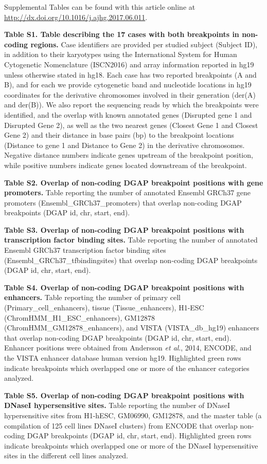 \documentclass[a4paper,twoside=true,openright,parskip=full,chapterprefix=true,11pt,headings=normal,bibliography=totoc,listof=totoc,titlepage=on,captions=tableabove,draft=false]{scrreprt}
\theoremstyle{definition}
\theoremstyle{definition}
\theoremstyle{definition}
\theoremstyle{remark}
\begin{document}
Supplemental Tables can be found with this article online at
\url{http://dx.doi.org/10.1016/j.ajhg.2017.06.011}.

\textbf{Table S1. Table describing the 17 cases with both breakpoints in
non-coding regions.} Case identifiers are provided per studied subject
(Subject ID), in addition to their karyotypes using the International
System for Human Cytogenetic Nomenclature (ISCN2016) and array
information reported in hg19 unless otherwise stated in hg18. Each case
has two reported breakpoints (A and B), and for each we provide
cytogenetic band and nucleotide locations in hg19 coordinates for the
derivative chromosomes involved in their generation (der(A) and der(B)).
We also report the sequencing reads by which the breakpoints were
identified, and the overlap with known annotated genes (Disrupted gene 1
and Disrupted Gene 2), as well as the two nearest genes (Closest Gene 1
and Closest Gene 2) and their distance in base pairs (bp) to the
breakpoint locations (Distance to gene 1 and Distance to Gene 2) in the
derivative chromosomes. Negative distance numbers indicate genes
upstream of the breakpoint position, while positive numbers indicate
genes located downstream of the breakpoint.

\textbf{Table S2. Overlap of non-coding DGAP breakpoint positions with
gene promoters.} Table reporting the number of annotated Ensembl GRCh37
gene promoters (Ensembl\_GRCh37\_promoters) that overlap non-coding DGAP
breakpoints (DGAP id, chr, start, end).

\textbf{Table S3. Overlap of non-coding DGAP breakpoint positions with
transcription factor binding sites.} Table reporting the number of
annotated Ensembl GRCh37 transcription factor binding sites
(Ensembl\_GRCh37\_tfbindingsites) that overlap non-coding DGAP
breakpoints (DGAP id, chr, start, end).

\textbf{Table S4. Overlap of non-coding DGAP breakpoint positions with
enhancers.} Table reporting the number of primary cell
(Primary\_cell\_enhancers), tissue (Tissue\_enhancers), H1-ESC
(ChromHMM\_H1\_ESC\_enhancers), GM12878 (ChromHMM\_GM12878\_enhancers),
and VISTA (VISTA\_db\_hg19) enhancers that overlap non-coding DGAP
breakpoints (DGAP id, chr, start, end). Enhancer positions were obtained
from Andersson \emph{et al}., 2014, ENCODE, and the VISTA enhancer
database human version hg19. Highlighted green rows indicate breakpoints
which overlapped one or more of the enhancer categories analyzed.

\textbf{Table S5. Overlap of non-coding DGAP breakpoint positions with
DNaseI hypersensitive sites.} Table reporting the number of DNaseI
hypersensitive sites from H1-hESC, GM06990, GM12878, and the master
table (a compilation of 125 cell lines DNaseI clusters) from ENCODE that
overlap non-coding DGAP breakpoints (DGAP id, chr, start, end).
Highlighted green rows indicate breakpoints which overlapped one or more
of the DNaseI hypersensitive sites in the different cell lines analyzed.
\end{document}
